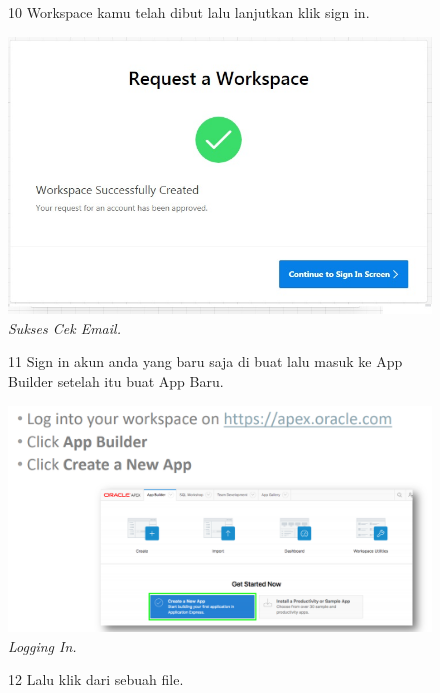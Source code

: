 \begin{enumerate}
\begin{figure}
\item[10] Workspace kamu telah dibut lalu lanjutkan klik sign in.

    \begin{center}
\includegraphics[scale=0.5]{figures/req8.jpg}
    \caption{\textit{Sukses Cek Email.}}
        \end{center}
\label{gambar}
\end{figure}

\begin{figure}
\item[11] Sign in akun anda yang baru saja di buat lalu masuk ke App Builder setelah itu buat App Baru.

    \begin{center}
\includegraphics[scale=0.5]{figures/4.PNG}
    \caption{\textit{Logging In.}}
        \end{center}
\label{gambar}
\end{figure}

\begin{figure}
\item[12] Lalu klik dari sebuah file.


\end{figure}
\end{enumerate}
